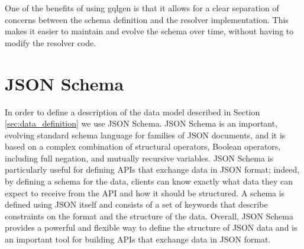 One of the benefits of using gqlgen is that it allows for a clear separation of 
concerns between the schema definition and the resolver implementation. This makes it 
easier to maintain and evolve the schema over time, without having to modify the resolver code.

\section{JSON Schema}

In order to define a description of the data model described in Section \ref{sec:data_definition}
we use JSON Schema. JSON Schema is an important, evolving standard schema language for families of JSON documents, and it is based on a complex combination of structural operators, Boo\-le\-an operators, including full negation,  and mutually recursive variables. JSON Schema is particularly useful for defining APIs that exchange data in JSON 
format; indeed, by defining a schema for the data, clients can know exactly what data 
they can expect to receive from the API and how it should be structured.
A schema is defined using JSON itself and consists of a set of keywords 
that describe constraints on the  format and the structure of the data. 
Overall, JSON Schema provides a powerful and flexible way to define the structure of 
JSON data and is an important tool for building APIs that exchange data in JSON format.
